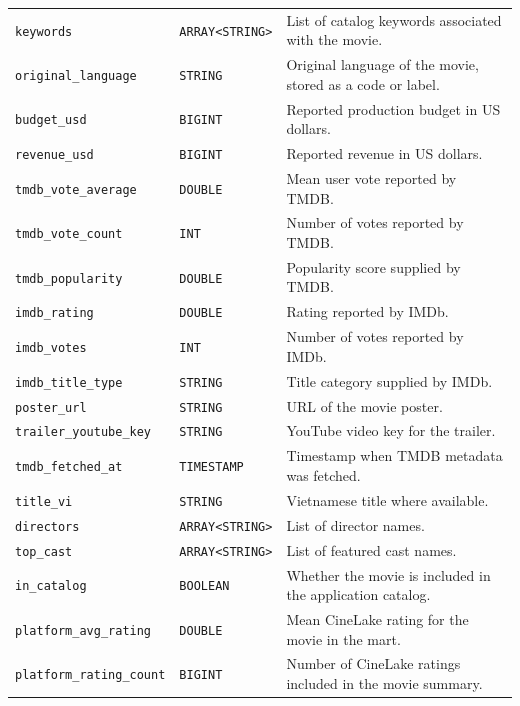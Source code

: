 \documentclass[a4paper,12pt]{article}
\newcommand{\dbsep}{\_\allowbreak}
\begin{document}
\begin{longtable}{@{}>{\raggedright\arraybackslash}p{}
                    >{\raggedright\arraybackslash}p{}
                    >{\raggedright\arraybackslash}p{}@{}}
\texttt{keywords} & \texttt{ARRAY\allowbreak\textless{}STRING\textgreater{}} & List of catalog keywords associated with the movie.\\
\texttt{original\dbsep language} & \texttt{STRING} & Original language of the movie, stored as a code or label.\\
\texttt{budget\dbsep usd} & \texttt{BIGINT} & Reported production budget in US dollars.\\
\texttt{revenue\dbsep usd} & \texttt{BIGINT} & Reported revenue in US dollars.\\
\texttt{tmdb\dbsep vote\dbsep average} & \texttt{DOUBLE} & Mean user vote reported by TMDB.\\
\texttt{tmdb\dbsep vote\dbsep count} & \texttt{INT} & Number of votes reported by TMDB.\\
\texttt{tmdb\dbsep popularity} & \texttt{DOUBLE} & Popularity score supplied by TMDB.\\
\texttt{imdb\dbsep rating} & \texttt{DOUBLE} & Rating reported by IMDb.\\
\texttt{imdb\dbsep votes} & \texttt{INT} & Number of votes reported by IMDb.\\
\texttt{imdb\dbsep title\dbsep type} & \texttt{STRING} & Title category supplied by IMDb.\\
\texttt{poster\dbsep url} & \texttt{STRING} & URL of the movie poster.\\
\texttt{trailer\dbsep youtube\dbsep key} & \texttt{STRING} & YouTube video key for the trailer.\\
\texttt{tmdb\dbsep fetched\dbsep at} & \texttt{TIMESTAMP} & Timestamp when TMDB metadata was fetched.\\
\texttt{title\dbsep vi} & \texttt{STRING} & Vietnamese title where available.\\
\texttt{directors} & \texttt{ARRAY\allowbreak\textless{}STRING\textgreater{}} & List of director names.\\
\texttt{top\dbsep cast} & \texttt{ARRAY\allowbreak\textless{}STRING\textgreater{}} & List of featured cast names.\\
\texttt{in\dbsep catalog} & \texttt{BOOLEAN} & Whether the movie is included in the application catalog.\\
\texttt{platform\dbsep avg\dbsep rating} & \texttt{DOUBLE} & Mean CineLake rating for the movie in the mart.\\
\texttt{platform\dbsep rating\dbsep count} & \texttt{BIGINT} & Number of CineLake ratings included in the movie summary.\\

\end{longtable}
\end{document}
